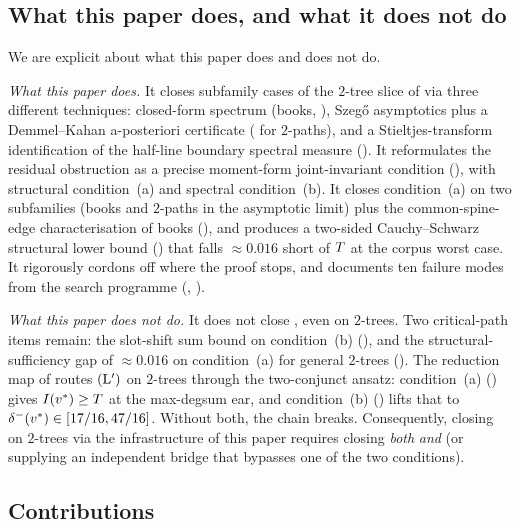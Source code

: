 \subsection{What this paper does, and what it does not do}\label{sec:intro:scope}

We are explicit about what this paper does and does not do.

\emph{What this paper does.} It closes subfamily cases of the
$2$-tree slice of  via three different techniques:
closed-form spectrum (books, ), Szeg\H{o} asymptotics
plus a Demmel--Kahan a-posteriori certificate
( for $2$-paths), and a
Stieltjes-transform identification of the half-line boundary spectral
measure (). It
reformulates the residual obstruction as a precise moment-form
joint-invariant condition (), with structural
condition~(a) and spectral condition~(b). It closes condition~(a) on
two subfamilies (books and $2$-paths in the asymptotic limit) plus the
common-spine-edge characterisation of books
(), and produces a two-sided
Cauchy--Schwarz structural lower bound () that
falls $\approx 0.016$ short of $T$ at the corpus worst case.
It rigorously cordons off where the proof stops, and documents ten
failure modes from the search programme
(, ).

\emph{What this paper does not do.} It does not close ,
even on $2$-trees. Two critical-path items remain: the slot-shift sum
bound on condition~(b) (), and the
structural-sufficiency gap of $\approx 0.016$ on condition~(a) for
general $2$-trees (). The reduction map of
 routes $(\mathrm{L}')$ on $2$-trees through the
two-conjunct ansatz: condition~(a) () gives
$I(v^{*}) \ge T$ at the max-degsum ear, and condition~(b)
() lifts that to $\delta^{-}(v^{*}) \in [17/16, 47/16]$.
Without both, the chain breaks. Consequently, closing 
on $2$-trees via the infrastructure of this paper requires closing
\emph{both}  \emph{and} 
(or supplying an independent bridge that bypasses one of the two
conditions).

\subsection{Contributions}\label{sec:intro:contributions}


